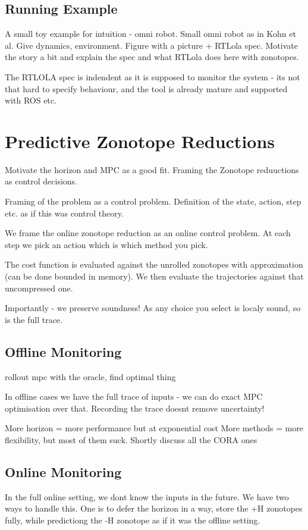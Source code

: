\documentclass[letterpaper, 10 pt, conference]{ieeeconf}  %
\begin{document}
\subsection{Running Example}
A small toy example for intuition - omni robot. Small omni robot as in Kohn et al. Give dynamics, environment. Figure with a picture + RTLola spec. Motivate the story a bit and explain the spec and what RTLola does here with zonotopes.

The RTLOLA spec is indendent as it is supposed to monitor the system - its not that hard to specify behaviour, and the tool is already mature and supported with ROS etc.




\section{Predictive Zonotope Reductions}

Motivate the horizon and MPC as a good fit. Framing the Zonotope reduuctions as control decisions. 

Framing of the problem as a control problem. Definition of the state, action, step etc. as if this was control theory. 

We frame the online zonotope reduction as an online control problem. At each step we pick an action which is which method you pick. 

The cost function is evaluated against the unrolled zonotopes with approximation (can be done bounded in memory). We then evaluate the trajectories against that uncompressed one.

Importantly - we preserve soundness! As any choice you select is localy sound, so is the full trace.



\subsection{Offline Monitoring}
rollout mpc with the oracle, find optimal thing

In offline cases we have the full trace of inputs - we can do exact MPC optimisation over that. Recording the trace doesnt remove uncertainty!

More horizon = more performance but at exponential cost
More methods = more flexibility, but most of them suck. Shortly discuss all the CORA ones 

\subsection{Online Monitoring}
In the full online setting, we dont know the inputs in the future. We have two ways to handle this. One is to defer the horizon in a way, store the +H zonotopes fully, while predictiong the -H zonotope as if it was the offline setting.
\end{document}
